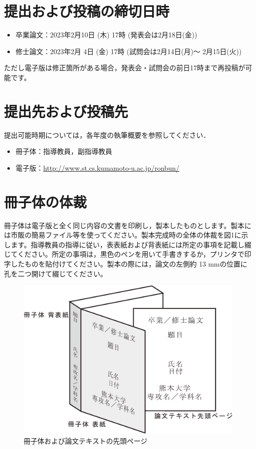 \documentclass[12pt]{kupaper}
\begin{document}
\chapter{提出および投稿の締切日時}
\begin{itemize}
	\item 卒業論文：2023年2月10日 (木) 17時 (発表会は2月18日(金))
	\item 修士論文：2023年2月 4日 (金) 17時 (試問会は2月14日(月)～ 2月15日(火))
\end{itemize}
ただし電子版は修正箇所がある場合，発表会・試問会の前日17時まで再投稿が可能です。

\chapter{提出先および投稿先}
提出可能時期については，各年度の執筆概要を参照してください．
\begin{itemize}
	\item 冊子体：指導教員，副指導教員
	\item 電子版：\url{http://www.st.cs.kumamoto-u.ac.jp/ronbun/}
\end{itemize}

\chapter{冊子体の体裁}

\cite{howtocite}

冊子体は電子版と全く同じ内容の文書を印刷し，製本したものとします。製本には市販の簡易ファイル等を使ってください。製本完成時の全体の体裁を図1に示します。指導教員の指導に従い，表表紙および背表紙には所定の事項を記載し綴じてください。所定の事項は，黒色のペンを用いて手書きするか，プリンタで印字したものを貼付けてください。製本の際には，論文の左側約 13 mmの位置に孔を二つ開けて綴じてください。

\begin{figure}[htbp]
	\centering
	\includegraphics[width=1.0\linewidth,keepaspectratio]{book.eps}
	\caption{冊子体および論文テキストの先頭ページ}
	\label{overview}
\end{figure}
\end{document}
